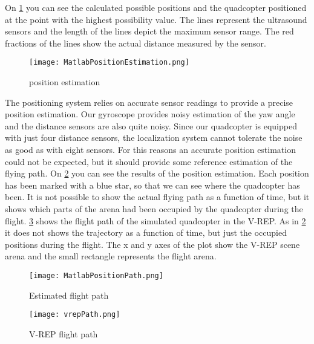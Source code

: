On \ref{fig:matlabPosEstimation} you can see the calculated possible positions and the quadcopter positioned at the point with the highest possibility value. 
The lines represent the ultrasound sensors and the length of the lines depict the maximum sensor range. 
The red fractions of the lines show the actual distance measured by the sensor. 

\begin{figure}[h!]
 \begin{center}
  \texttt{[image: MatlabPositionEstimation.png]}
 \end{center}
  \caption{position estimation\label{fig:matlabPosEstimation}}
\end{figure}

The positioning system relies on accurate sensor readings to provide a precise position estimation. 
Our gyroscope provides noisy estimation of the yaw angle and the distance sensors are also quite noisy. 
Since our quadcopter is equipped with just four distance sensors, the localization system cannot tolerate the noise as good as with eight sensors. 
For this reasons an accurate position estimation could not be expected, but it should provide some reference estimation of the flying path. 
On \ref{fig:matlabPosPath} you can see the results of the position estimation. 
Each position has been marked with a blue star, so that we can see where the quadcopter has been. 
It is not possible to show the actual flying path as a function of time, but it shows which parts of the arena had been occupied by the quadcopter during the flight. 
\ref{fig:vrepPosPath} shows the flight path of the simulated quadcopter in the V-REP. 
As in \ref{fig:matlabPosPath} it does not shows the trajectory as a function of time, but just the occupied positions during the flight. 
The x and y axes of the plot show the V-REP scene arena and the small rectangle represents the flight arena.

\begin{figure}[h!]
 \begin{center}
  \texttt{[image: MatlabPositionPath.png]}
 \end{center}
  \caption{Estimated flight path\label{fig:matlabPosPath}}
\end{figure}

\begin{figure}[h!]
 \begin{center}
  \texttt{[image: vrepPath.png]}
 \end{center}
  \caption{V-REP flight path\label{fig:vrepPosPath}}
\end{figure}

